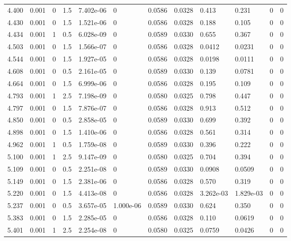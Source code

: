\documentclass[preview]{standalone}
\begin{document}
{{{\begin{tabular}{L{1.2cm}C{1.2cm} C{0.3cm}C{0.5cm} C{1.4cm}C{1.4cm} C{1.4cm}C{1.4cm} C{1.6cm}C{1.6cm} C{1.6cm}C{1.6cm}}
  4.400  &  0.001  & 0     & 1.5 &  7.402e-06  & 0  &  0.0586&   0.0328& 0.413 & 0.231   &  0 & 0  \\ 
  4.430  &  0.001  & 0     & 1.5 &  1.521e-06  & 0  &  0.0586&   0.0328& 0.188 & 0.105   &  0 & 0  \\ 
  4.434  &  0.001  & 1     & 0.5 &  6.028e-09  & 0  &  0.0589&   0.0330& 0.655 & 0.367   &  0 & 0  \\ 
  4.503  &  0.001  & 0     & 1.5 &  1.566e-07  & 0  &  0.0586&   0.0328& 0.0412 & 0.0231   &  0 & 0  \\ 
  4.544  &  0.001  & 0     & 1.5 &  1.927e-05  & 0  &  0.0586&   0.0328& 0.0198 & 0.0111   &  0 & 0  \\ 
  4.608  &  0.001  & 0     & 0.5 &  2.161e-05  & 0  &  0.0589&   0.0330& 0.139 & 0.0781   &  0 & 0  \\ 
  4.664  &  0.001  & 0     & 1.5 &  6.999e-06  & 0  &  0.0586&   0.0328& 0.195 & 0.109   &  0 & 0  \\ 
  4.793  &  0.001  & 1     & 2.5 &  7.198e-09  & 0  &  0.0580&   0.0325& 0.798 & 0.447   &  0 & 0  \\ 
  4.797  &  0.001  & 0     & 1.5 &  7.876e-07  & 0  &  0.0586&   0.0328& 0.913 & 0.512   &  0 & 0  \\ 
  4.850  &  0.001  & 0     & 0.5 &  2.858e-05  & 0  &  0.0589&   0.0330& 0.699 & 0.392   &  0 & 0  \\ 
  4.898  &  0.001  & 0     & 1.5 &  1.410e-06  & 0  &  0.0586&   0.0328& 0.561 & 0.314   &  0 & 0  \\ 
  4.962  &  0.001  & 1     & 0.5 &  1.759e-08  & 0  &  0.0589&   0.0330& 0.396 & 0.222   &  0 & 0  \\ 
  5.100  &  0.001  & 1     & 2.5 &  9.147e-09  & 0  &  0.0580&   0.0325& 0.704 & 0.394   &  0 & 0  \\ 
  5.109  &  0.001  & 0     & 0.5 &  2.251e-08  & 0  &  0.0589&   0.0330& 0.0908 & 0.0509   &  0 & 0  \\ 
  5.149  &  0.001  & 0     & 1.5 &  2.381e-06  & 0  &  0.0586&   0.0328& 0.570 & 0.319   &  0 & 0  \\ 
  5.220  &  0.001  & 0     & 1.5 &  4.413e-08  & 0  &  0.0586&   0.0328& 3.262e-03 & 1.829e-03   &  0 & 0  \\ 
  5.237  &  0.001  & 0     & 0.5 &  3.657e-05  & 1.000e-06  &  0.0589&   0.0330& 0.624 & 0.350   &  0 & 0  \\ 
  5.383  &  0.001  & 0     & 1.5 &  2.285e-05  & 0  &  0.0586&   0.0328& 0.110 & 0.0619   &  0 & 0  \\ 
  5.401  &  0.001  & 1     & 2.5 &  2.254e-08  & 0  &  0.0580&   0.0325& 0.0759 & 0.0426   &  0 & 0  \\ 

\end{tabular}}}}
\end{document}
